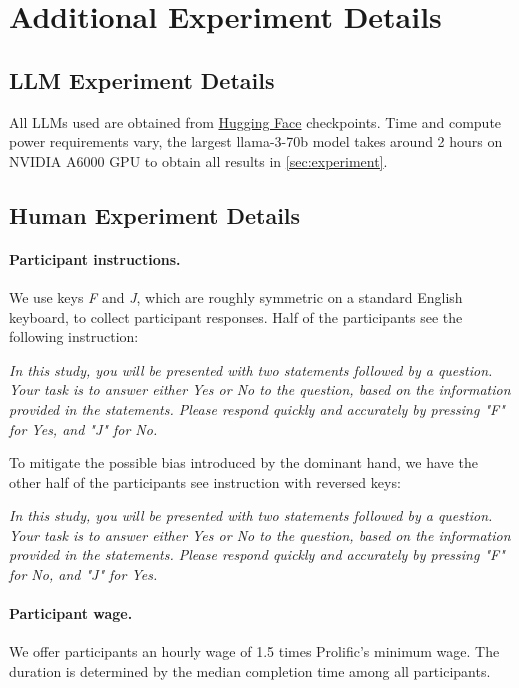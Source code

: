 \section{Additional Experiment Details}

\subsection{LLM Experiment Details}
\label{subsec:llm-details}
All LLMs used are obtained from \href{https://huggingface.co/models}{Hugging Face} checkpoints.
Time and compute power requirements vary, the largest llama-3-70b model takes around 2 hours on NVIDIA A6000 GPU to obtain all results in \cref{sec:experiment}.

\subsection{Human Experiment Details}
\label{subsec:human-details}
\paragraph{Participant instructions.}
We use keys \textit{F} and \textit{J}, which are roughly symmetric on a standard English keyboard, to collect participant responses.
Half of the participants see the following instruction:

\textit{In this study, you will be presented with two statements followed by a question. Your task is to answer either Yes or No to the question, based on the information provided in the statements.
    Please respond quickly and accurately by pressing "F" for Yes, and "J" for No.}

To mitigate the possible bias introduced by the dominant hand, we have the other half of the participants see instruction with reversed keys:

\textit{In this study, you will be presented with two statements followed by a question. Your task is to answer either Yes or No to the question, based on the information provided in the statements.
    Please respond quickly and accurately by pressing "F" for No, and "J" for Yes.}

\paragraph{Participant wage.}
We offer participants an hourly wage of 1.5 times Prolific's minimum wage.
The duration is determined by the median completion time among all participants.
